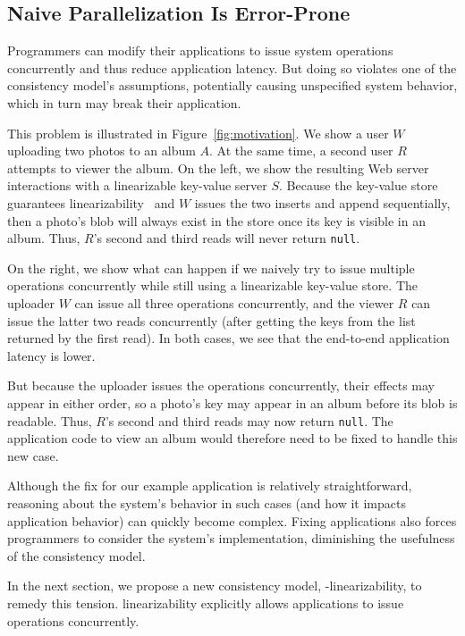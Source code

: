 \subsection{Naive Parallelization Is Error-Prone}

Programmers can modify their applications to issue system operations concurrently
and thus reduce application latency. But doing so violates one of the consistency
model's assumptions, potentially causing unspecified system behavior,
which in turn may break their application.

This problem is illustrated in Figure~\ref{fig:motivation}. We
show a user $W$ uploading two photos to an album $A$. At the same time, a
second user $R$ attempts to viewer the album. On the left, we show the
resulting Web server interactions with a linearizable key-value server $S$.
Because the key-value store guarantees
linearizability~\cite{herlihy1990linearizability} and $W$ issues the
two inserts and append sequentially, then a photo's blob will
always exist in the store once its key is visible in an album.
Thus, $R$'s second and third reads will never return \texttt{null}.

On the right, we show what can happen if we naively try to issue multiple
operations concurrently while still using a linearizable key-value store.
The uploader $W$ can issue all three operations concurrently, and the
viewer $R$ can issue the latter two reads concurrently (after getting the keys
from the list returned by the first read). In both cases, we see that the
end-to-end application latency is lower.

But because the uploader issues the operations concurrently,
their effects may appear in either order, so a photo's key may appear in an 
album before its blob is readable. Thus, $R$'s second and third reads may now
return \texttt{null}. The application code to view an album would therefore
need to be fixed to handle this new case.

Although the fix for our example application is relatively straightforward,
reasoning about the system's behavior in such cases (and how it impacts application behavior)
can quickly become complex.
Fixing applications also forces programmers to consider the system's implementation,
diminishing the usefulness of the consistency model.

In the next section, we propose a new \multidispatch{} 
consistency model, \md{}-linearizability, to remedy this 
tension. \Multidispatch{} linearizability explicitly allows 
applications to issue operations concurrently.

